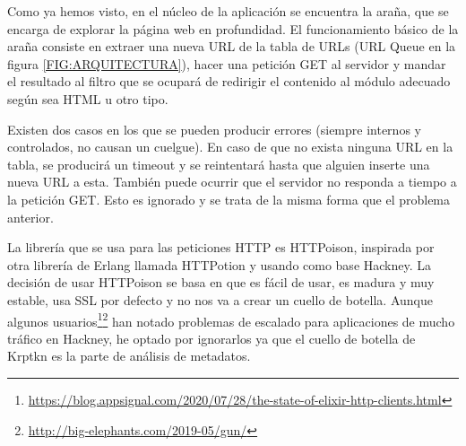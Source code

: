 Como ya hemos visto, en el núcleo de la aplicación se encuentra la araña, que se encarga de explorar la página web en profundidad. El funcionamiento básico de la araña consiste en extraer una nueva URL de la tabla de URLs (URL Queue en la figura \ref{FIG:ARQUITECTURA}), hacer una petición GET al servidor y mandar el resultado al filtro que se ocupará de redirigir el contenido al módulo adecuado según sea HTML u otro tipo.

Existen dos casos en los que se pueden producir errores (siempre internos y controlados, no causan un cuelgue). En caso de que no exista ninguna URL en la tabla, se producirá un timeout y se reintentará hasta que alguien inserte una nueva URL a esta. También puede ocurrir que el servidor no responda a tiempo a la petición GET. Esto es ignorado y se trata de la misma forma que el problema anterior.

La librería que se usa para las peticiones HTTP es HTTPoison, inspirada por otra librería de Erlang llamada HTTPotion y usando como base Hackney. La decisión de usar HTTPoison se basa en que es fácil de usar, es madura y muy estable, usa SSL por defecto y no nos va a crear un cuello de botella. Aunque algunos usuarios\footnote{\url{https://blog.appsignal.com/2020/07/28/the-state-of-elixir-http-clients.html}}\footnote{\url{http://big-elephants.com/2019-05/gun/}} han notado problemas de escalado para aplicaciones de mucho tráfico en Hackney, he optado por ignorarlos ya que el cuello de botella de Krptkn es la parte de análisis de metadatos.